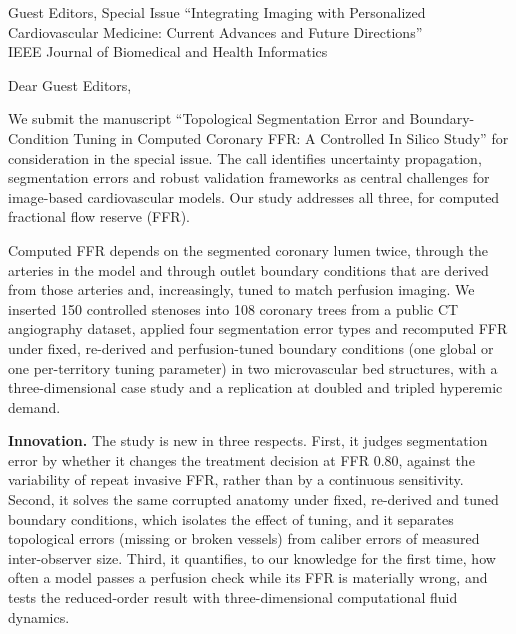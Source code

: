 \documentclass[10pt]{letter}
\date{\today}
\begin{document}
\begin{letter}{Guest Editors, Special Issue ``Integrating Imaging with Personalized Cardiovascular Medicine: Current
Advances and Future Directions''\\IEEE Journal of Biomedical and Health Informatics}
\opening{Dear Guest Editors,}

We submit the manuscript ``Topological Segmentation Error and Boundary-Condition Tuning in Computed Coronary FFR: A
Controlled In Silico Study'' for consideration in the special issue. The call identifies uncertainty propagation,
segmentation errors and robust validation frameworks as central challenges for image-based cardiovascular models. Our
study addresses all three, for computed fractional flow reserve (FFR).

Computed FFR depends on the segmented coronary lumen twice, through the arteries in the model and through outlet boundary conditions that are derived from those arteries and, increasingly, tuned to match perfusion imaging. We
inserted 150 controlled stenoses into 108 coronary trees from a public CT angiography dataset, applied four segmentation
error types and recomputed FFR under fixed, re-derived and perfusion-tuned boundary conditions (one global or one
per-territory tuning parameter) in two microvascular bed structures, with a three-dimensional case study and a
replication at doubled and tripled hyperemic demand.

\textbf{Innovation.} The study is new in three respects. First, it judges segmentation error by whether it changes
the treatment decision at FFR 0.80, against the variability of repeat invasive FFR, rather than by a continuous
sensitivity. Second, it solves the same corrupted anatomy under fixed, re-derived and tuned boundary conditions,
which isolates the effect of tuning, and it separates topological errors (missing or broken vessels) from caliber
errors of measured inter-observer size. Third, it quantifies, to our knowledge for the first time, how often a model
passes a perfusion check while its FFR is materially wrong, and tests the reduced-order result with
three-dimensional computational fluid dynamics.


\end{letter}
\end{document}
